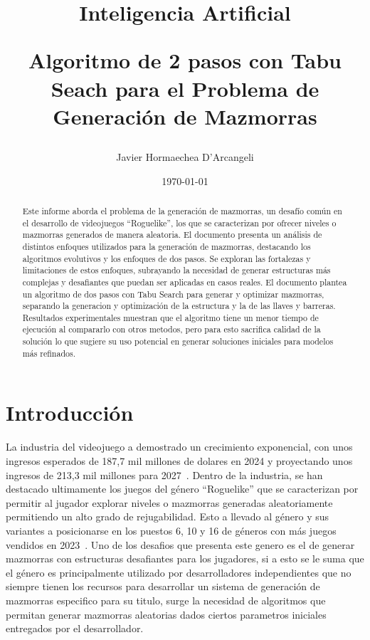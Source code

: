 \documentclass[letter, 10pt]{article}
\begin{document}
\title{Inteligencia Artificial \\ \begin{Large}Algoritmo de 2 pasos con Tabu Seach para el Problema de Generaci\'on de Mazmorras\end{Large}}
\author{Javier Hormaechea D'Arcangeli}
\date{\today}
\maketitle


\begin{abstract}
Este informe aborda el problema de la generaci\'on de mazmorras, un desaf\'io com\'un en el desarrollo de videojuegos ``Roguelike'', los que se caracterizan por ofrecer niveles o mazmorras generados de manera aleatoria. El documento presenta un an\'alisis de distintos enfoques utilizados para la generaci\'on de mazmorras, destacando los algoritmos evolutivos y los enfoques de dos pasos. Se exploran las fortalezas y limitaciones de estos enfoques, subrayando la necesidad de generar estructuras m\'as complejas y desafiantes que puedan ser aplicadas en casos reales. El documento plantea un algoritmo de dos pasos con Tabu Search para generar y optimizar mazmorras, separando la generacion y optimizaci\'on de la estructura y la de las llaves y barreras. Resultados experimentales muestran que el algoritmo tiene un menor tiempo de ejecuci\'on al compararlo con otros metodos, pero para esto sacrifica calidad de la soluci\'on lo que sugiere su uso potencial en generar soluciones iniciales para modelos m\'as refinados.

\end{abstract}

\section{Introducci\'on}
La industria del videojuego a demostrado un crecimiento exponencial, con unos ingresos esperados de 187,7 mil millones de dolares en 2024 y proyectando unos ingresos de 213,3 mil millones para 2027~\cite{newzooreport}. Dentro de la industria, se han destacado ultimamente los juegos del g\'enero ``Roguelike'' que se caracterizan por permitir al jugador explorar niveles o mazmorras generadas aleatoriamente permitiendo un alto grado de rejugabilidad. Esto a llevado al g\'enero y sus variantes a posicionarse en los puestos 6, 10 y 16 de g\'eneros con m\'as juegos vendidos en 2023~\cite{topsell}. Uno de los desafios que presenta este genero es el de generar mazmorras con estructuras desafiantes para los jugadores, si a esto se le suma que el g\'enero es principalmente utilizado por desarrolladores independientes que no siempre tienen los recursos para desarrollar un sistema de generaci\'on de mazmorras especifico para su titulo, surge la necesidad de algoritmos que permitan generar mazmorras aleatorias dados ciertos parametros iniciales entregados por el desarrollador.
\end{document}
